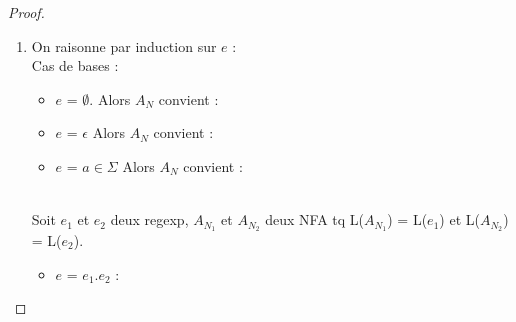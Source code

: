 \begin{proof}
	\begin{enumerate}
	\item On raisonne par induction sur $e$ : \\
		Cas de bases : \\ 
		\begin{itemize}[label=$\star$]
			\item $e$ = $\emptyset$. Alors $A_{N}$ convient :
			\item $e$ = $\epsilon$ Alors $A_{N}$ convient :
			\item $e$ = $a \in \Sigma$ Alors $A_{N}$ convient :
		\end{itemize}
	\enspace\\
		Soit $e_{1}$ et $e_{2}$ deux regexp, $A_{N_{1}}$ et $A_{N_{2}}$ deux NFA tq  L($A_{N_{1}}$) = L($e_{1}$) et L($A_{N_{2}}$) = L($e_{2}$). \\
		\begin{itemize}[label=$\star$]
			\item $e$ = $e_{1}.e_{2}$ :

\end{itemize}
\end{enumerate}
\end{proof}
